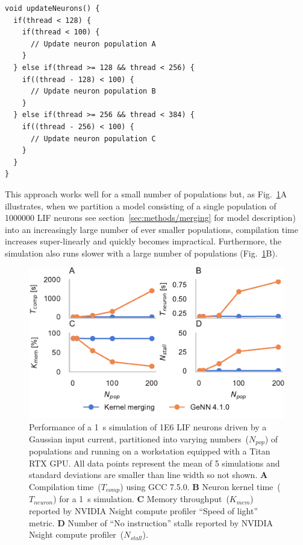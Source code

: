 \documentclass[9pt,a4paper]{amsart}
\begin{document}
\begin{lstlisting}
void updateNeurons() {
  if(thread < 128) {
    if(thread < 100) {
      // Update neuron population A
    }
  } else if(thread >= 128 && thread < 256) {
    if((thread - 128) < 100) {
      // Update neuron population B
    }
  } else if(thread >= 256 && thread < 384) {
    if((thread - 256) < 100) {
      // Update neuron population C
    }
  }
}
\end{lstlisting}
%
This approach works well for a small number of populations but, as Fig.~\ref{fig:merging_scaling}A illustrates, when we partition a model consisting of a single population of \num{1000000} LIF neurons see section~\ref{sec:methods/merging} for model description) into an increasingly large number of ever smaller populations, compilation time increases super-linearly and quickly becomes impractical.
Furthermore, the simulation also runs slower with a large number of populations (Fig.~\ref{fig:merging_scaling}B).
%
\begin{figure}
    \centering
    \includegraphics{figures/merging_scaling}
    \caption{Performance of a \SI{1}{\second} simulation of \num{1E6} LIF neurons driven by a Gaussian input current, partitioned into varying numbers~($N_{pop}$) of populations and running on a workstation equipped with a Titan RTX GPU.
    All data points represent the mean of 5 simulations and standard deviations are smaller than line width so not shown.
    \textbf{A} Compilation time~($T_{comp}$) using GCC 7.5.0.
    \textbf{B} Neuron kernel time~($T_{neuron}$) for a \SI{1}{\second} simulation.
    \textbf{C} Memory throughput~($K_{mem}$) reported by NVIDIA Nsight compute profiler ``Speed of light'' metric.
    \textbf{D} Number of ``No instruction'' stalls reported by NVIDIA Nsight compute profiler~($N_{stall}$).}
    \label{fig:merging_scaling}
\end{figure}
\end{document}

